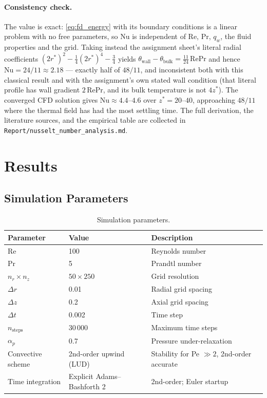 \documentclass[12pt,a4paper]{article}
\newcommand{\Rey}{\text{Re}}
\newcommand{\Pran}{\text{Pr}}
\begin{document}
\paragraph{Consistency check.} The value is exact: \eqref{eq:fd_energy} with its boundary
conditions is a linear problem with no free parameters, so $\text{Nu}$ is independent of $\Rey$,
$\Pran$, $q_w$, the fluid properties and the grid. Taking instead the assignment sheet's literal
radial coefficients $(2r^*)^2-\tfrac14(2r^*)^4-\tfrac34$ yields
$\theta_{\text{wall}}-\theta_{\text{bulk}} = \tfrac{11}{24}\,\Rey\Pran$ and hence
$\text{Nu}=24/11\approx2.18$ --- exactly half of $48/11$, and inconsistent both with this
classical result and with the assignment's own stated wall condition (that literal profile has
wall gradient $2\,\Rey\Pran$, and its bulk temperature is not $4z^*$). The converged CFD
solution gives $\text{Nu}\approx4.4\text{--}4.6$ over $z^*=20\text{--}40$, approaching $48/11$
where the thermal field has had the most settling time. The full derivation, the literature
sources, and the empirical table are collected in
\texttt{Report/nusselt\_number\_analysis.md}.

\newpage

\section{Results}

\subsection{Simulation Parameters}

\begin{table}[H]
\centering
\caption{Simulation parameters.}
\label{tab:params}
\begin{tabular}{lll}
\toprule
\textbf{Parameter} & \textbf{Value} & \textbf{Description} \\
\midrule
$\Rey$ & 100 & Reynolds number \\
$\Pran$ & 5 & Prandtl number \\
$n_r \times n_z$ & $50 \times 250$ & Grid resolution \\
$\Delta r$ & 0.01 & Radial grid spacing \\
$\Delta z$ & 0.2 & Axial grid spacing \\
$\Delta t$ & 0.002 & Time step \\
$n_{\text{steps}}$ & 30\,000 & Maximum time steps \\
$\alpha_p$ & 0.7 & Pressure under-relaxation \\
Convective scheme & 2nd-order upwind (LUD) & Stability for Pe $\gg 2$, 2nd-order accurate \\
Time integration & Explicit Adams--Bashforth 2 & 2nd-order; Euler startup \\
\bottomrule
\end{tabular}
\end{table}
\end{document}
